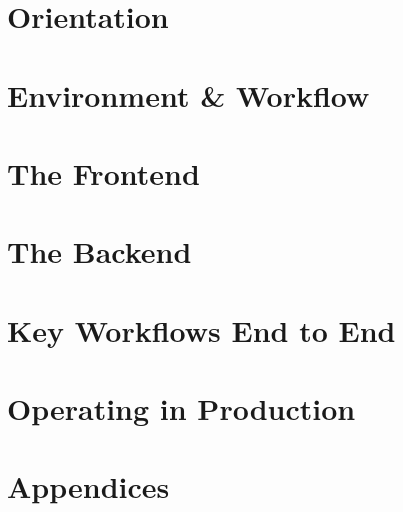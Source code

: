 \documentclass[11pt,oneside]{book}
\begin{document}


\frontmatter


\tableofcontents

\mainmatter

\part{Orientation}




\part{Environment \& Workflow}




\part{The Frontend}





\part{The Backend}






\part{Key Workflows End to End}




\part{Operating in Production}






\appendix
\part{Appendices}



\end{document}
